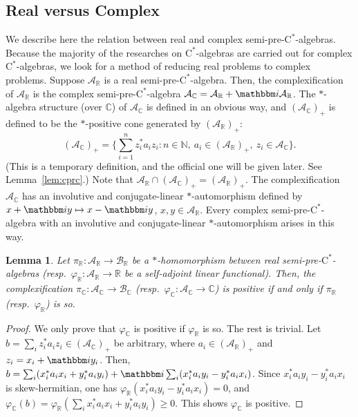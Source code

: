 \documentclass[12pt]{amsart}
\newtheorem{lem}[thm]{Lemma}
\theoremstyle{definition}
\begin{document}
\subsection{Real versus Complex}\label{sec:realvscomplex}
We describe here the relation between real and complex {semi-pre-$\mathrm{C}^*$-alge\-bra\xspace}{}s.
Because the majority of the researches on {$\mathrm{C}^*$-alge\-bra\xspace}{}s are carried out
for complex {$\mathrm{C}^*$-alge\-bra\xspace}{}s, we look for a method of reducing
real problems to complex problems. Suppose ${{\mathcal A}}_{{\mathbb R}}$ is a real {semi-pre-$\mathrm{C}^*$-alge\-bra\xspace}.
Then, the complexification of ${{\mathcal A}}_{{\mathbb R}}$ is the complex
{semi-pre-$\mathrm{C}^*$-alge\-bra\xspace} ${{\mathcal A}}_{{\mathbb C}}={{\mathcal A}}_{{\mathbb R}}+{{\mathbbm i}}{{\mathcal A}}_{{\mathbb R}}$.
The $*$-algebra structure (over ${{\mathbb C}}$) of ${{\mathcal A}}_{{\mathbb C}}$ is defined in an obvious way,
and $({{\mathcal A}}_{{\mathbb C}})_+$ is defined to be the $*$-positive cone generated by $({{\mathcal A}}_{{\mathbb R}})_+$:
\[
({{\mathcal A}}_{{\mathbb C}})_+ = \{ \sum_{i=1}^n z_i^*a_iz_i : n\in{{\mathbb N}},\ a_i\in({{\mathcal A}}_{{\mathbb R}})_+,\ z_i\in{{\mathcal A}}_{{\mathbb C}}\}.
\]
(This is a temporary definition, and the official one will be given later.
See Lemma~\ref{lem:cprc}.)
Note that ${{\mathcal A}}_{{\mathbb R}}\cap({{\mathcal A}}_{{\mathbb C}})_+=({{\mathcal A}}_{{\mathbb R}})_+$.
The complexification ${{\mathcal A}}_{{\mathbb C}}$ has an involutive and conjugate-linear $*$-automorphism
defined by $x+{{\mathbbm i}} y\mapsto x-{{\mathbbm i}} y$, $x,y\in{{\mathcal A}}_{{\mathbb R}}$.
Every complex {semi-pre-$\mathrm{C}^*$-alge\-bra\xspace} with an involutive and
conjugate-linear $*$-automorphism arises in this way.

\begin{lem}
Let $\pi_{{\mathbb R}}\colon{{\mathcal A}}_{{\mathbb R}}\to{{\mathcal B}}_{{\mathbb R}}$ be a $*$-homomorphism between real {semi-pre-$\mathrm{C}^*$-alge\-bra\xspace}{}s
(resp.\ ${\varphi}_{{\mathbb R}}\colon{{\mathcal A}}_{{\mathbb R}}\to{{\mathbb R}}$ be a self-adjoint linear functional).
Then, the complexification $\pi_{{\mathbb C}}\colon{{\mathcal A}}_{{\mathbb C}}\to{{\mathcal B}}_{{\mathbb C}}$
(resp.\ ${\varphi}_{{\mathbb C}}\colon{{\mathcal A}}_{{\mathbb C}}\to{{\mathbb C}}$) is positive if and only if
$\pi_{{\mathbb R}}$ (resp.\ ${\varphi}_{{\mathbb R}}$) is so.
\end{lem}
\begin{proof}
We only prove that ${\varphi}_{{\mathbb C}}$ is positive if ${\varphi}_{{\mathbb R}}$ is so. The rest is trivial.
Let $b=\sum_i z_i^*a_iz_i\in ({{\mathcal A}}_{{\mathbb C}})_+$ be arbitrary, where $a_i\in({{\mathcal A}}_{{\mathbb R}})_+$
and $z_i=x_i+{{\mathbbm i}} y_i$. Then,
$b=\sum_i (x_i^*a_ix_i + y_i^*a_iy_i) + {{\mathbbm i}}\sum_i(x_i^*a_iy_i-y_i^*a_ix_i)$.
Since $x_i^*a_iy_i-y_i^*a_ix_i$ is skew-hermitian, one has
${\varphi}_{{\mathbb R}}(x_i^*a_iy_i-y_i^*a_ix_i)=0$, and
${\varphi}_{{\mathbb C}}(b)={\varphi}_{{\mathbb R}}(\sum_i x_i^*a_ix_i + y_i^*a_iy_i)\geq0$.
This shows ${\varphi}_{{\mathbb C}}$ is positive.
\end{proof}
\end{document}
